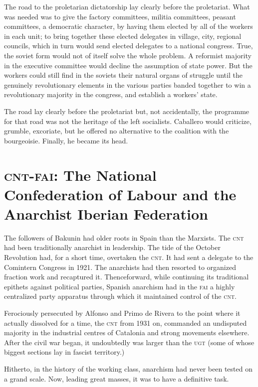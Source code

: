 The road to the proletarian dictatorship lay clearly before the proletariat. What was needed was to give the factory committees, militia committees, peasant committees, a democratic character, by having them elected by all of the workers in each unit; to bring together these elected delegates in village, city, regional councils, which in turn would send elected delegates to a national congress. True, the soviet form would not of itself solve the whole problem. A reformist majority in the executive committee would decline the assumption of state power. But the workers could still find in the soviets their natural organs of struggle until the genuinely revolutionary elements in the various parties banded together to win a revolutionary majority in the congress, and establish a workers’ state.

The road lay clearly before the proletariat but, not accidentally, the programme for that road was not the heritage of the left socialists. Caballero would criticize, grumble, excoriate, but he offered no alternative to the coalition with the bourgeoisie. Finally, he became its head.

\section{\textsc{cnt-fai}: The National Confederation of Labour and the Anarchist Iberian Federation}

The followers of Bakunin had older roots in Spain than the Marxists. The \textsc{cnt} had been traditionally anarchist in leadership. The tide of the October Revolution had, for a short time, overtaken the \textsc{cnt}. It had sent a delegate to the Comintern Congress in 1921. The anarchists had then resorted to organized fraction work and recaptured it. Thenceforward, while continuing its traditional epithets against political parties, Spanish anarchism had in the \textsc{fai} a highly centralized party apparatus through which it maintained control of the \textsc{cnt}.

Ferociously persecuted by Alfonso and Primo de Rivera to the point where it actually dissolved for a time, the \textsc{cnt} from 1931 on, commanded an undisputed majority in the industrial centres of Catalonia and strong movements elsewhere. After the civil war began, it undoubtedly was larger than the \textsc{ugt} (some of whose biggest sections lay in fascist territory.)

Hitherto, in the history of the working class, anarchism had never been tested on a grand scale. Now, leading great masses, it was to have a definitive task.

